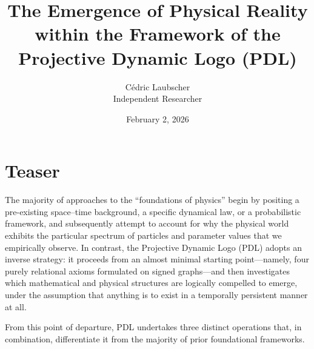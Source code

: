 \documentclass[11pt,a4paper]{article}
\title{The Emergence of Physical Reality\\
within the Framework of the Projective Dynamic Logo (PDL)}
\author{Cédric Laubscher\\
\small Independent Researcher}
\date{February 2, 2026}
\begin{document}
\maketitle

\section*{Teaser}

The majority of approaches to the “foundations of physics” begin by positing a pre-existing space–time background, a specific dynamical law, or a probabilistic framework, and subsequently attempt to account for why the physical world exhibits the particular spectrum of particles and parameter values that we empirically observe. In contrast, the Projective Dynamic Logo (PDL) adopts an inverse strategy: it proceeds from an almost minimal starting point—namely, four purely relational axioms formulated on signed graphs—and then investigates which mathematical and physical structures are logically compelled to emerge, under the assumption that anything is to exist in a temporally persistent manner at all.

From this point of departure, PDL undertakes three distinct operations that, in combination, differentiate it from the majority of prior foundational frameworks.
\end{document}
